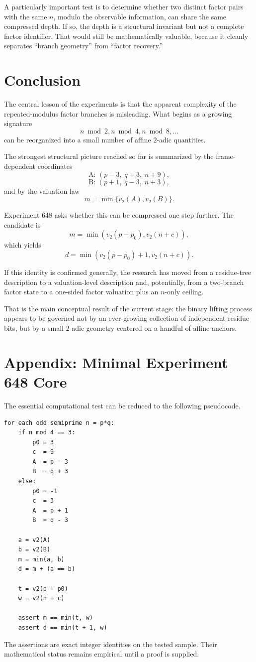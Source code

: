 \documentclass[11pt,a4paper]{article}
\newcommand{\vTwo}{v_2}
\begin{document}
A particularly important test is to determine whether two distinct factor pairs with the same $n$, modulo the observable information, can share the same compressed depth. If so, the depth is a structural invariant but not a complete factor identifier. That would still be mathematically valuable, because it cleanly separates ``branch geometry'' from ``factor recovery.''

\section{Conclusion}

The central lesson of the experiments is that the apparent complexity of the repeated-modulus factor branches is misleading. What begins as a growing signature
\[
    n\bmod2,
    n\bmod4,
    n\bmod8,
    \ldots
\]
can be reorganized into a small number of affine $2$-adic quantities.

The strongest structural picture reached so far is summarized by the frame-dependent coordinates
\[
    \text{A: }(p-3,\;q+3,\;n+9),
\]
\[
    \text{B: }(p+1,\;q-3,\;n+3),
\]
and by the valuation law
\[
    m=\min\{\vTwo(A),\vTwo(B)\}.
\]

Experiment 648 asks whether this can be compressed one step further. The candidate is
\[
    m=\min\left(\vTwo(p-p_0),\vTwo(n+c)\right),
\]
which yields
\[
    \boxed{
    d=\min\left(\vTwo(p-p_0)+1,\vTwo(n+c)\right).
    }
\]

If this identity is confirmed generally, the research has moved from a residue-tree description to a valuation-level description and, potentially, from a two-branch factor state to a one-sided factor valuation plus an $n$-only ceiling.

That is the main conceptual result of the current stage: the binary lifting process appears to be governed not by an ever-growing collection of independent residue bits, but by a small $2$-adic geometry centered on a handful of affine anchors.

\section*{Appendix: Minimal Experiment 648 Core}

The essential computational test can be reduced to the following pseudocode.

\begin{lstlisting}[basicstyle=\ttfamily\small,breaklines=true]
for each odd semiprime n = p*q:
    if n mod 4 == 3:
        p0 = 3
        c  = 9
        A  = p - 3
        B  = q + 3
    else:
        p0 = -1
        c  = 3
        A  = p + 1
        B  = q - 3

    a = v2(A)
    b = v2(B)
    m = min(a, b)
    d = m + (a == b)

    t = v2(p - p0)
    w = v2(n + c)

    assert m == min(t, w)
    assert d == min(t + 1, w)
\end{lstlisting}

The assertions are exact integer identities on the tested sample. Their mathematical status remains empirical until a proof is supplied.
\end{document}
